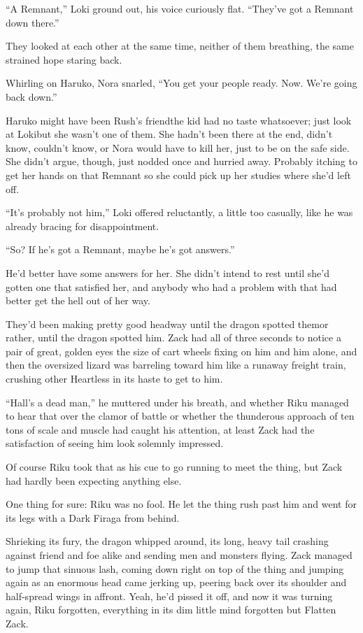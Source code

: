``A Remnant,'' Loki ground out, his voice curiously flat. ``They've got a Remnant down there.''

They looked at each other at the same time, neither of them breathing, the same strained hope staring back.

Whirling on Haruko, Nora snarled, ``You get your people ready. Now. We're going back down.''

Haruko might have been Rush's friend\textemdash the kid had no taste whatsoever; just look at Loki\textemdash but she wasn't one of them. She hadn't been there at the end, didn't know, couldn't know, or Nora would have to kill her, just to be on the safe side. She didn't argue, though, just nodded once and hurried away. Probably itching to get her hands on that Remnant so she could pick up her studies where she'd left off.

``It's probably not him,'' Loki offered reluctantly, a little too casually, like he was already bracing for disappointment.

``So? If he's got a Remnant, maybe he's got answers.''

He'd better have some answers for her. She didn't intend to rest until she'd gotten one that satisfied her, and anybody who had a problem with that had better get the hell out of her way.


\scenechange


They'd been making pretty good headway until the dragon spotted them\textemdash or rather, until the dragon spotted him. Zack had all of three seconds to notice a pair of great, golden eyes the size of cart wheels fixing on him and him alone, and then the oversized lizard was barreling toward him like a runaway freight train, crushing other Heartless in its haste to get to him.

``Hall's a dead man,'' he muttered under his breath, and whether Riku managed to hear that over the clamor of battle or whether the thunderous approach of ten tons of scale and muscle had caught his attention, at least Zack had the satisfaction of seeing him look solemnly impressed.

Of course Riku took that as his cue to go running to meet the thing, but Zack had hardly been expecting anything else.

One thing for sure: Riku was no fool. He let the thing rush past him and went for its legs with a Dark Firaga from behind.

Shrieking its fury, the dragon whipped around, its long, heavy tail crashing against friend and foe alike and sending men and monsters flying. Zack managed to jump that sinuous lash, coming down right on top of the thing and jumping again as an enormous head came jerking up, peering back over its shoulder and half-spread wings in affront. Yeah, he'd pissed it off, and now it was turning again, Riku forgotten, everything in its dim little mind forgotten but Flatten Zack.

